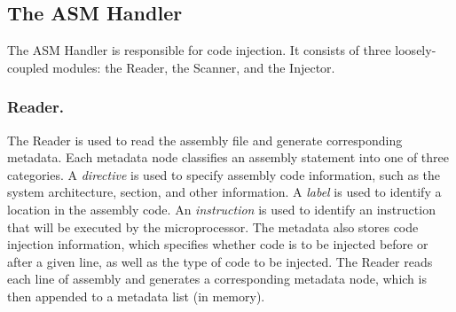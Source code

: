\subsection{The ASM Handler}

The ASM Handler is responsible for code injection. It consists of three loosely-coupled modules: the Reader, the Scanner, and the Injector.
\vspace{-15pt}
\subsubsection{Reader.}

The Reader is used to read the assembly file and generate corresponding metadata. Each metadata node classifies an assembly statement into one of three categories. A \textit{directive} is used to specify assembly code information, such as the system architecture, section, and other information. A \textit{label} is used to identify a location in the assembly code. An \textit{instruction} is used to identify an instruction that will be executed by the microprocessor. The metadata also stores code injection information, which specifies whether code is to be injected before or after a given line, as well as the type of code to be injected. The Reader reads each line of assembly and generates a corresponding metadata node, which is then appended to a metadata list (in memory).

